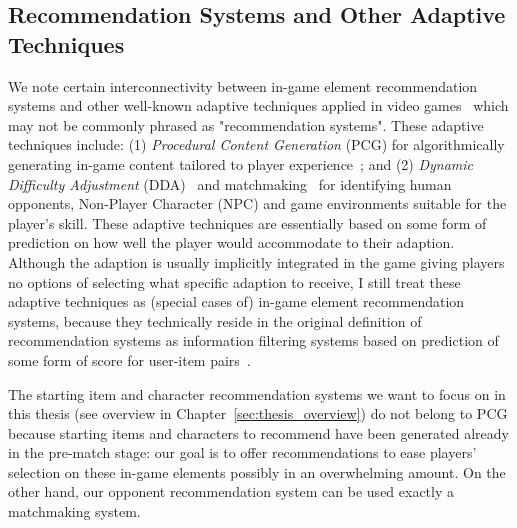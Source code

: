 \subsection{Recommendation Systems and Other Adaptive Techniques}

We note certain interconnectivity between in-game element recommendation systems and other well-known adaptive techniques applied in video games~\cite{bakkes2012personalised,chen2015analytics} which may not be commonly phrased as "recommendation systems". These adaptive techniques include: (1) \textit{Procedural Content Generation} (PCG) for algorithmically generating in-game content tailored to player experience~\cite{yannakakis2011experience,togelius2011search}; and (2) \textit{Dynamic Difficulty Adjustment} (DDA)~\cite{hunicke2005case} and matchmaking~\cite{Delalleau2012,herbrich:trueskill} for identifying human opponents, Non-Player Character (NPC) and game environments suitable for the player's skill. These adaptive techniques are essentially based on some form of prediction on how well the player would accommodate to their adaption. Although the adaption is usually implicitly integrated in the game giving players no options of selecting what specific adaption to receive, I still treat these adaptive techniques as (special cases of) in-game element recommendation systems, because they technically reside in the original definition of recommendation systems as information filtering systems based on prediction of some form of score for user-item pairs~\cite{isinkaye2015recommendation,bobadilla2013recommender,resnick1997recommender,adomavicius2005toward}. 

The starting item and character recommendation systems we want to focus on in this thesis (see overview in Chapter~\ref{sec:thesis_overview}) do not belong to PCG because starting items and characters to recommend have been generated already in the pre-match stage: our goal is to offer recommendations to ease players' selection on these in-game elements possibly in an overwhelming amount. On the other hand, our opponent recommendation system can be used exactly a matchmaking system. 



